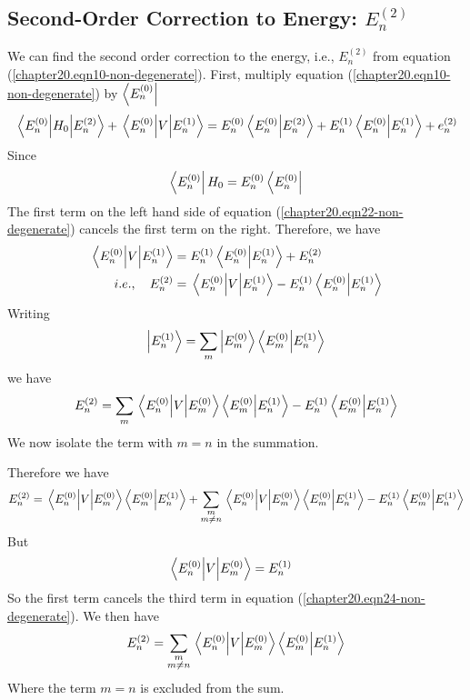 	
	\subsection{Second-Order Correction to Energy: $E_n^{(2)}$}
	
	We can find the second order correction to the energy, i.e., $E^{(2)}_n$ from equation (\ref{chapter20.eqn10-non-degenerate}). First, multiply equation (\ref{chapter20.eqn10-non-degenerate}) by $\bra{E_n^{(0)}}$ 
	\begin{equation}
		\matrixel{E_n^{(0)}} {H_0} {E_n^{(2)}} + \matrixel{E_n^{(0)}} {V} {E_n^{(1)}} = E_n^{(0)} \braket{E_n^{(0)}}{E_n^{(2)}} + E_n^{(1)} \braket{E_n^{(0)}}{E_n^{(1)}} + e_n^{(2)}
		\label{chapter20.eqn22-non-degenerate}
	\end{equation}
	Since
	\begin{equation}
		\bra{E_n^{(0)}} H_0 = E_n^{(0)} \bra{E_n^{(0)}}
	\end{equation}
	The first term on the left hand side of equation (\ref{chapter20.eqn22-non-degenerate}) cancels the first term on the right. Therefore, we have
	\begin{align}
		\matrixel{E_n^{(0)}} {V} {E_n^{(1)}} 
		&=  E_n^{(1)} \braket{E_n^{(0)}}{E_n^{(1)}} + E_n^{(2)}\\
		i.e., \quad E_n^{(2)} &=  \matrixel{E_n^{(0)}} {V} {E_n^{(1)}}  - E_n^{(1)} \braket{E_n^{(0)}}{E_n^{(1)}}
		\label{chapter20.eqn23-non-degenerate}
	\end{align}
	Writing
	\begin{equation}
		\ket{E_n^{(1)}} = \sum_{m} \ket{E_m^{(0)}} \braket{E_m^{(0)}}{E_n^{(1)}}
	\end{equation}
	we have
	\begin{equation}
		E_n^{(2)} = \sum_{m} \matrixel{E_n^{(0)}} {V} {E_m^{(0)}} \braket{E_m^{(0)}}{E_n^{(1)}}  -  E_n^{(1)} \braket{E_m^{(0)}}{E_n^{(1)}}
	\end{equation}
	We now isolate the term with $m=n$ in the summation.
	
	Therefore we have
	\begin{equation}
		E_n^{(2)} = \matrixel{E_n^{(0)}} {V} {E_m^{(0)}} \braket{E_m^{(0)}}{E_n^{(1)}} + \sum_{\substack{m\\ m \neq n}} \matrixel{E_n^{(0)}} {V} {E_m^{(0)}} \braket{E_m^{(0)}}{E_n^{(1)}}  -  E_n^{(1)} \braket{E_m^{(0)}}{E_n^{(1)}}
		\label{chapter20.eqn24-non-degenerate}
	\end{equation}
	But
	\begin{align}
		\matrixel{E_n^{(0)}} {V} {E_m^{(0)}} &= E_n^{(1)}
	\end{align}
	So the first term cancels the third term in equation (\ref{chapter20.eqn24-non-degenerate}). We then have
	\begin{equation}
		E_n^{(2)} = \sum_{\substack{m\\ m \neq n}} \matrixel{E_n^{(0)}} {V} {E_m^{(0)}} \braket{E_m^{(0)}}{E_n^{(1)}}
		\label{chapter20.eqn25-non-degenerate}
	\end{equation}
	Where the 
	term $m=n$ is excluded from the sum.

